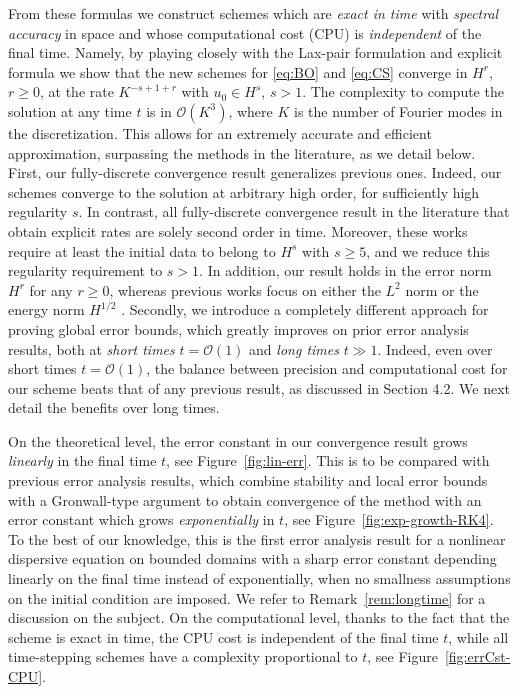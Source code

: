 \documentclass [11pt] {article}
\begin{document}
From these formulas we construct schemes which are {\it exact in time} with {\it spectral accuracy} in space and whose computational cost (CPU) is {\it independent} of the final time. Namely, by playing closely with the Lax-pair formulation and explicit formula we show that the new schemes for \eqref{eq:BO} and \eqref{eq:CS} converge in $H^r$, $r\geq 0$, at the rate $K^{-s+1+r}$ with $u_0\in H^s$, $s>1$. The complexity to compute the solution at any time $t$ is in $\mathcal O(K^3)$, where $K$ is the number of Fourier modes in the discretization.
This allows for an extremely accurate and efficient approximation, surpassing the methods in the literature, as we detail below. First, our fully-discrete convergence result generalizes previous ones. Indeed, our schemes converge to the solution
at arbitrary high order, for sufficiently high regularity $s$.
In contrast, all fully-discrete convergence result in the literature that obtain explicit rates \cite{T98, PD01, DM09, G16} are solely second order in time.
Moreover, these works require at least the initial data to belong to  $H^s$  with $ s \ge 5$, and we reduce this regularity requirement to $ s > 1$.
In addition, our result holds in the error norm $H^r$ for any $r \ge 0$, whereas previous works focus on either the $L^2$ norm \cite{T98,PD01,G16} or the energy norm $H^{1/2}$ \cite{DM09}.
Secondly, we introduce a completely different approach for proving global error bounds, which greatly improves on prior error analysis results,
both at {\it short times} $t=\mathcal O(1)$ and {\it long times} $t\gg 1$.
Indeed, even over short times $t=\mathcal O(1)$, the balance between precision and computational cost for our scheme beats that of any previous result, as discussed in Section 4.2. 
We next detail the benefits over long times.

On the theoretical level, the error constant in our convergence result grows {\it linearly} in the final time $t$, see Figure~\ref{fig:lin-err}.
This is to be compared with previous error analysis results, which combine stability and local error bounds with a Gronwall-type argument to obtain convergence of the method with an error constant which grows {\it exponentially} in $t$, see Figure~\ref{fig:exp-growth-RK4}. To the best of our knowledge, this is the first error analysis result for a nonlinear dispersive equation on bounded domains with a sharp error constant depending linearly on the final time instead of exponentially, when no smallness assumptions on the initial condition are imposed. We refer to Remark~\ref{rem:longtime} for a discussion on the subject.
On the computational level, thanks to the fact that the scheme is exact in time, the CPU cost is independent of the final time $t$, while all time-stepping schemes have a complexity proportional to $t$, see Figure~\ref{fig:errCst-CPU}.
\end{document}
